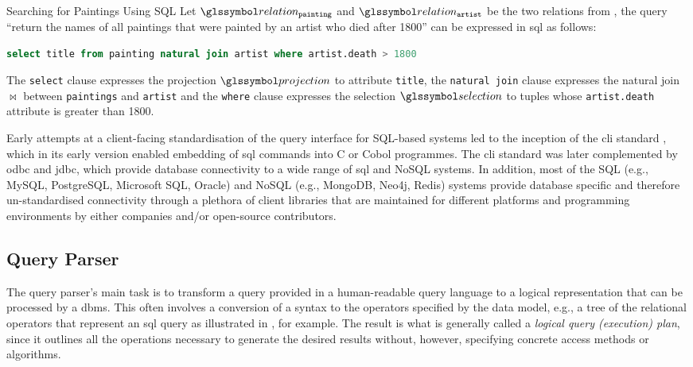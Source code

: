 \begin{example}[label=example:sql_query]{Searching for Paintings Using SQL}{}
    Let  $\relation_{\mathtt{painting}}$ and $\relation_{\mathtt{artist}}$ be the two relations from , the query ``return the names of all paintings that were painted by an artist who died after 1800'' can be expressed in \acrshort{sql} as follows:

    \begin{lstlisting}[language=SQL, showspaces=false, basicstyle=\ttfamily, numbers=none]
        select title from painting natural join artist where artist.death > 1800
    \end{lstlisting}

    The \texttt{select} clause expresses the projection $\projection$ to attribute \texttt{title}, the \texttt{natural join} clause expresses the natural join $\Join$ between \texttt{paintings} and \texttt{artist} and the \texttt{where} clause expresses the selection $\selection$ to tuples whose \texttt{artist.death} attribute is greater than 1800.
\end{example}

Early attempts at a client-facing standardisation of the query interface for SQL-based systems led to the inception of the \acrfull{cli} standard \cite{XOpen:1995CLI}, which in its early version enabled embedding of \acrshort{sql} commands into C or Cobol programmes. The \acrshort{cli} standard was later complemented by \acrfull{odbc} and \acrfull{jdbc}, which provide database connectivity to a wide range of \acrshort{sql} and NoSQL systems. In addition, most of the SQL (e.g., MySQL, PostgreSQL, Microsoft SQL, Oracle) and NoSQL (e.g., MongoDB, Neo4j, Redis) systems provide database specific and therefore un-standardised connectivity through a plethora of client libraries that are maintained for different platforms and programming environments by either companies and/or open-source contributors.

\subsection{Query Parser}

The query parser's main task is to transform a query provided in a human-readable query language to a logical representation that can be processed by a \acrshort{dbms}. This often involves a conversion of a syntax to the operators specified by the data model, e.g., a tree of the relational operators that represent an \acrshort{sql} query as illustrated in , for example. The result is what is generally called a \emph{logical query (execution) plan}, since it outlines all the operations necessary to generate the desired results without, however, specifying concrete access methods or algorithms.


